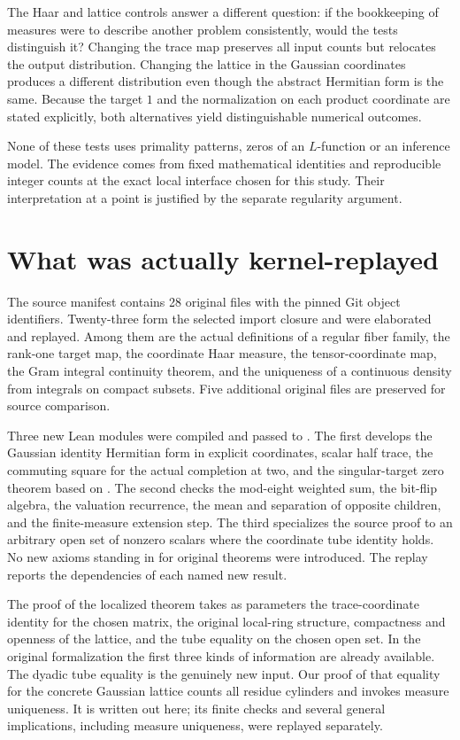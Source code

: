 \documentclass[12pt,letterpaper]{article}
\newcommand{\code}[1]{\texttt{\detokenize{#1}}}
\begin{document}
The Haar and lattice controls answer a different question: if the bookkeeping of measures were to describe another problem consistently, would the tests distinguish it? Changing the trace map preserves all input counts but relocates the output distribution. Changing the lattice in the Gaussian coordinates produces a different distribution even though the abstract Hermitian form is the same. Because the target \(1\) and the normalization on each product coordinate are stated explicitly, both alternatives yield distinguishable numerical outcomes.

None of these tests uses primality patterns, zeros of an \(L\)-function or an inference model. The evidence comes from fixed mathematical identities and reproducible integer counts at the exact local interface chosen for this study. Their interpretation at a point is justified by the separate regularity argument.

\clearpage\section{What was actually kernel-replayed}
The source manifest contains 28 original files with the pinned Git object identifiers. Twenty-three form the selected import closure and were elaborated and replayed. Among them are the actual definitions of a regular fiber family, the rank-one target map, the coordinate Haar measure, the tensor-coordinate map, the Gram integral continuity theorem, and the uniqueness of a continuous density from integrals on compact subsets. Five additional original files are preserved for source comparison.

Three new Lean modules were compiled and passed to \code{leanchecker}. The first develops the Gaussian identity Hermitian form in explicit coordinates, scalar half trace, the commuting square for the actual completion at two, and the singular-target zero theorem based on \code{IsGramFib}. The second checks the mod-eight weighted sum, the bit-flip algebra, the valuation recurrence, the mean and separation of opposite children, and the finite-measure extension step. The third specializes the source proof to an arbitrary open set of nonzero scalars where the coordinate tube identity holds. No new axioms standing in for original theorems were introduced. The replay reports the dependencies of each named new result.

The proof of the localized theorem takes as parameters the trace-coordinate identity for the chosen matrix, the original local-ring structure, compactness and openness of the lattice, and the tube equality on the chosen open set. In the original formalization the first three kinds of information are already available. The dyadic tube equality is the genuinely new input. Our proof of that equality for the concrete Gaussian lattice counts all residue cylinders and invokes measure uniqueness. It is written out here; its finite checks and several general implications, including measure uniqueness, were replayed separately.
\end{document}
